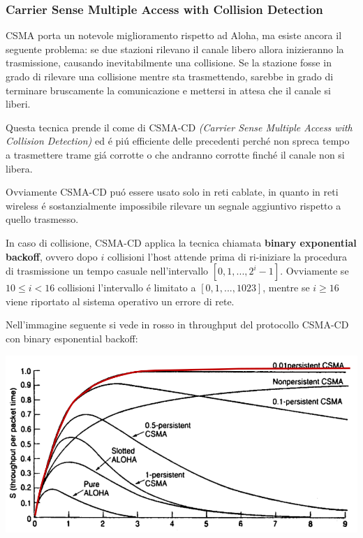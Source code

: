\documentclass[12pt]{article}
\begin{document}
\clearpage
\subsubsection{Carrier Sense Multiple Access with Collision Detection}\label{mac-allorazione-canale-a-contesa-csma-cd}
CSMA porta un notevole miglioramento rispetto ad Aloha, ma esiste ancora il seguente problema: se due stazioni rilevano il 
canale libero allora inizieranno la trasmissione, causando inevitabilmente una collisione. Se la stazione fosse in grado
di rilevare una collisione mentre sta trasmettendo, sarebbe in grado di terminare bruscamente la comunicazione e mettersi
in attesa che il canale si liberi.

Questa tecnica prende il come di CSMA-CD \textit{(Carrier Sense Multiple Access with Collision Detection)} ed \'e pi\'u
efficiente delle precedenti perch\'e non spreca tempo a trasmettere trame gi\'a corrotte o che andranno corrotte finch\'e 
il canale non si libera.

Ovviamente CSMA-CD pu\'o essere usato solo in reti cablate, in quanto in reti wireless \'e sostanzialmente impossibile 
rilevare un segnale aggiuntivo rispetto a quello trasmesso.

In caso di collisione, CSMA-CD applica la tecnica chiamata \textbf{binary exponential backoff}, ovvero dopo $i$ collisioni
l'host attende prima di ri-iniziare la procedura di trasmissione un tempo casuale nell'intervallo $[0,1,...,2^i-1]$. 
Ovviamente se $10 \leq i < 16$ collisioni l'intervallo \'e limitato a $[0,1,...,1023]$, mentre se $i \geq 16$ viene 
riportato al sistema operativo un errore di rete.

Nell'immagine seguente si vede in rosso in throughput del protocollo CSMA-CD con binary esponential backoff:
\begin{center}
	\includegraphics[scale=0.5]{livello_collegamento-img9.png}
\end{center}
\end{document}

